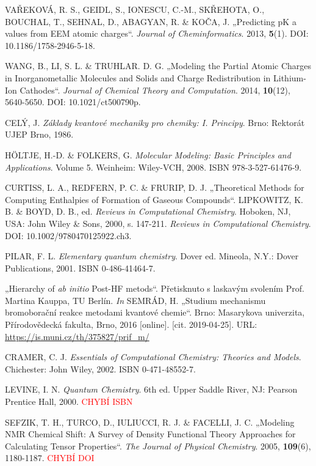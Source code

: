 \begin{thebibliography}{10}
VAŘEKOVÁ, R. S., GEIDL, S., IONESCU, C.-M., SKŘEHOTA, O., BOUCHAL, T., SEHNAL, D., ABAGYAN, R. \& KOČA, J. „Predicting pK a values from EEM atomic charges“. \textit{Journal of Cheminformatics}. 2013, \textbf{5}(1). DOI: 10.1186/1758-2946-5-18.

WANG, B., LI, S. L. \& TRUHLAR. D. G. „Modeling the Partial Atomic Charges in Inorganometallic Molecules and Solids and Charge Redistribution in Lithium-Ion Cathodes“. \textit{Journal of Chemical Theory and Computation}. 2014, \textbf{10}(12), 5640-5650. DOI: 10.1021/ct500790p.


CELÝ, J. \textit{Základy kvantové mechaniky pro chemiky: I. Principy}. Brno: Rektorát UJEP Brno, 1986.

HÖLTJE, H.-D. \& FOLKERS, G. \textit{Molecular Modeling: Basic Principles and Applications}. Volume 5. Weinheim: Wiley-VCH, 2008. ISBN 978-3-527-61476-9.

CURTISS, L. A., REDFERN, P. C. \& FRURIP, D. J. „Theoretical Methods for Computing Enthalpies of Formation of Gaseous Compounds“. LIPKOWITZ, K. B. \& BOYD, D. B., ed. \textit{Reviews in Computational Chemistry}. Hoboken, NJ, USA: John Wiley \& Sons, 2000, s. 147-211. \textit{Reviews in Computational Chemistry}. DOI: 10.1002/9780470125922.ch3.

PILAR, F. L. \textit{Elementary quantum chemistry}. Dover ed. Mineola, N.Y.: Dover Publications, 2001. ISBN 0-486-41464-7.

„Hierarchy of \textit{ab initio} Post-HF metods“. Přetisknuto s laskavým svolením Prof. Martina Kauppa, TU Berlín. \textit{In} SEMRÁD, H. „Studium mechanismu bromoborační reakce metodami kvantové chemie“. Brno: Masarykova univerzita, Přírodovědecká fakulta, Brno, 2016 [online]. [cit. 2019-04-25]. URL: \url{https://is.muni.cz/th/375827/prif_m/}

CRAMER, C. J. \textit{Essentials of Computational Chemistry: Theories and Models}. Chichester: John Wiley, 2002. ISBN 0-471-48552-7.

LEVINE, I. N. \textit{Quantum Chemistry}. 6th ed. Upper Saddle River, NJ: Pearson Prentice Hall, 2000. \textcolor{red}{CHYBÍ ISBN}

SEFZIK, T. H., TURCO, D., IULIUCCI, R. J. \& FACELLI, J. C. „Modeling NMR Chemical Shift: A Survey of Density Functional Theory Approaches for Calculating Tensor Properties“. \textit{The Journal of Physical Chemistry}. 2005, \textbf{109}(6), 1180-1187. \textcolor{red}{CHYBÍ DOI}


\end{thebibliography}
